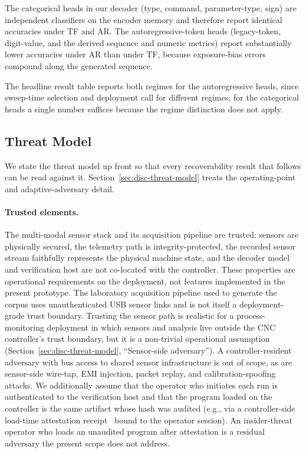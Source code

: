 \documentclass[sensors,article,submit,moreauthors,pdftex]{Definitions/mdpi}
\begin{document}
The categorical heads in our decoder (type, command, parameter-type, sign) are independent classifiers on the encoder memory and therefore report identical accuracies under TF and AR. The autoregressive-token heads (legacy-token, digit-value, and the derived sequence and numeric metrics) report substantially lower accuracies under AR than under TF, because exposure-bias errors compound along the generated sequence.

The headline result table reports both regimes for the autoregressive heads, since sweep-time selection and deployment call for different regimes; for the categorical heads a single number suffices because the regime distinction does not apply.

\subsection{Threat Model}
\label{sec:problem-threat-model}

We state the threat model up front so that every recoverability result that follows can be read against it. Section~\ref{sec:disc-threat-model} treats the operating-point and adaptive-adversary detail.

\paragraph{Trusted elements.} The multi-modal sensor stack and its acquisition pipeline are trusted: sensors are physically secured, the telemetry path is integrity-protected, the recorded sensor stream faithfully represents the physical machine state, and the decoder model and verification host are not co-located with the controller. These properties are operational requirements on the deployment, not features implemented in the present prototype. The laboratory acquisition pipeline used to generate the corpus uses unauthenticated USB sensor links and is not itself a deployment-grade trust boundary. Trusting the sensor path is realistic for a process-monitoring deployment in which sensors and analysis live outside the CNC controller's trust boundary, but it is a non-trivial operational assumption (Section~\ref{sec:disc-threat-model}, ``Sensor-side adversary''). A controller-resident adversary with bus access to shared sensor infrastructure is out of scope, as are sensor-side wire-tap, EMI injection, packet replay, and calibration-spoofing attacks. We additionally assume that the operator who initiates each run is authenticated to the verification host and that the program loaded on the controller is the same artifact whose hash was audited (e.g., via a controller-side load-time attestation receipt~\cite{zonouz2014plc} bound to the operator session). An insider-threat operator who loads an unaudited program after attestation is a residual adversary the present scope does not address.
\end{document}
